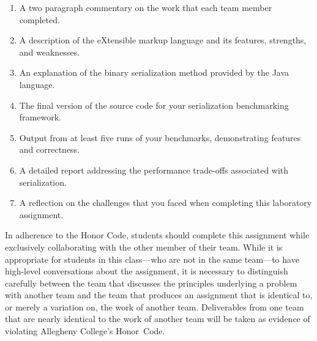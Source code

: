
\begin{enumerate}
    \setlength{\itemsep}{0pt}
  \item A two paragraph commentary on the work that each team member completed. 
  \item A description of the eXtensible markup language and its features, strengths, and weaknesses.
  \item An explanation of the binary serialization method provided by the Java language.
    \item The final version of the source code for your serialization benchmarking framework.
      \item Output from at least five runs of your benchmarks, demonstrating features and correctness.
  \item A detailed report addressing the performance trade-offs associated with serialization.
  \item A reflection on the challenges that you faced when completing this laboratory assignment.
\end{enumerate}


In adherence to the Honor Code, students should complete this assignment while exclusively collaborating with the
other member of their team. While it is appropriate for students in this class---who are not in the same team---to have
high-level conversations about the assignment, it is necessary to distinguish carefully between the team that discusses
the principles underlying a problem with another team and the team that produces an assignment that is identical to, or
merely a variation on, the work of another team.  Deliverables from one team that are nearly identical to the work of
another team will be taken as evidence of violating Allegheny College's \mbox{Honor Code}.



